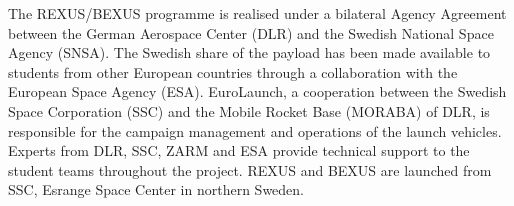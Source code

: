 \documentclass[final,3p,times,twocolumn]{elsarticle}
\begin{document}
\vspace{5pt}
\par\noindent *The REXUS/BEXUS programme is realised under a bilateral Agency Agreement between the German  Aerospace  Center  (DLR)  and  the  Swedish  National  Space  Agency  (SNSA).  The Swedish  share  of  the  payload  has  been  made  available  to  students  from  other  European countries  through  a  collaboration  with  the  European  Space  Agency  (ESA).  EuroLaunch,  a cooperation  between  the  Swedish  Space  Corporation  (SSC)  and  the  Mobile  Rocket  Base (MORABA) of DLR, is responsible for the campaign management and operations of the launch vehicles. Experts from DLR, SSC, ZARM and ESA provide technical support to the student teams  throughout  the  project.  REXUS  and  BEXUS  are  launched  from  SSC,  Esrange  Space Center in northern Sweden.



\begin{nolinenumbers}



\end{nolinenumbers}





\end{document}
